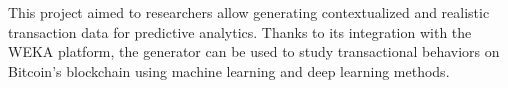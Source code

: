 \documentclass[conference]{IEEEtran}
\begin{document}
This project aimed to researchers allow generating contextualized and realistic transaction data for predictive analytics. Thanks to its integration with the WEKA platform, the generator can be used to study transactional behaviors on Bitcoin's blockchain using machine learning and deep learning methods.

 






\end{document}
